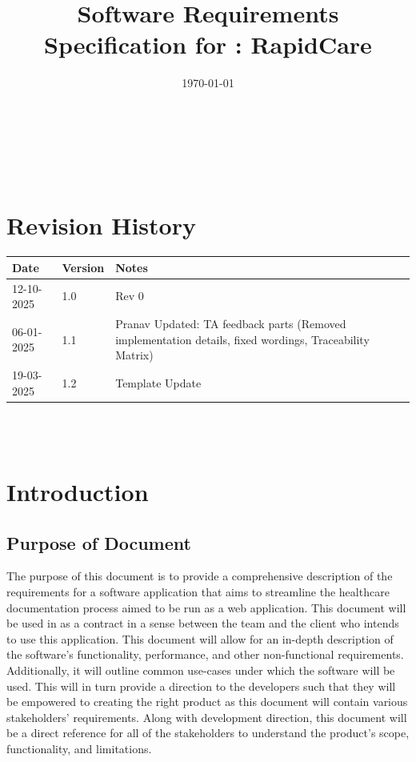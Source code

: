 \documentclass[12pt]{article}
\begin{document}
\title{Software Requirements Specification for \progname: RapidCare} 
\author{\authname}
\date{\today}
	
\maketitle

~\newpage


\tableofcontents

~\newpage

\section*{Revision History}

\begin{tabularx}{\textwidth}{p{3cm}p{2cm}X}
\toprule {\textbf{Date}} & {\textbf{Version}} & {\textbf{Notes}}\\
\midrule
12-10-2025 & 1.0 & Rev 0\\
06-01-2025 & 1.1 & Pranav Updated: TA feedback parts (Removed implementation details, fixed wordings, Traceability Matrix)\\
19-03-2025 & 1.2 & Template Update \\
\bottomrule
\end{tabularx}

~\\

~\newpage

\section{Introduction}

\subsection{Purpose of Document} \label{sec_PurposeOfDocument}
The purpose of this document is to provide a comprehensive description of the requirements for a software application that aims to streamline the healthcare documentation process aimed to be run as a web application. This document will be used in as a contract in a sense between the team and the client who intends to use this application. This document will allow for an in-depth description of the software's functionality, performance, and other non-functional requirements. Additionally, it will outline common use-cases under which the software will be used. This will in turn provide a direction to the developers such that they will be empowered to creating the right product as this document will contain various stakeholders' requirements. Along with development direction, this document will be a direct reference for all of the stakeholders to understand the product's scope, functionality, and limitations.
\end{document}
